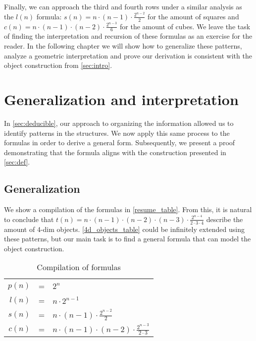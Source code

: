 \documentclass{article}
\begin{document}
	Finally, we can approach the third and fourth rows under a similar analysis as the $l(n)$ formula: $s(n) = n\cdot(n-1)\cdot\frac{2^{n-2}}{2}$ for the amount of squares and $c(n) = n\cdot(n-1)\cdot(n-2)\cdot\frac{2^{n-3}}{6}$ for the amount of cubes. We leave the task of finding the interpretation and recursion of these formulas as an exercise for the reader. In the following chapter we will show how to generalize these patterns, analyze a geometric interpretation and prove our derivation is consistent with the object construction from \autoref{sec:intro}.
	
	\section{Generalization and interpretation \label{sec:generalization}}
	
	In \autoref{sec:deducible}, our approach to organizing the information allowed us to identify patterns in the structures. We now apply this same process to the formulas in order to derive a general form. Subsequently, we present a proof demonstrating that the formula aligns with the construction presented in \autoref{sec:def}.
	
	\subsection{Generalization}
	
	We show a compilation of the formulas in \autoref{resume_table}. From this, it is natural to conclude that $t(n) = n\cdot(n-1)\cdot(n-2)\cdot(n-3)\cdot\frac{2^{n-4}}{2 \cdot 3 \cdot 4}$ describe the amount of 4-dim objects. \autoref{4d_objects_table} could be infinitely extended using these patterns, but our main task is to find a general formula that can model the object construction.
	
	
	\begin{table}[ht]
		\centering
		\begin{tabular}{r c l}
			
			$p(n)$ & = &$ 2^{n}$ \\[0.7ex]
			$l(n)$ & = &$ n \cdot 2^{n-1}$ \\[0.4ex]
			$s(n)$ & = &$ n\cdot(n-1)\cdot\frac{2^{n-2}}{2}$\\[0.4ex]
			$c(n)$ & = &$ n \cdot (n-1) \cdot (n-2) \cdot \frac{2^{n-3}}{2 \cdot 3}$%
		\end{tabular}
		\caption{Compilation of formulas}
		\label{resume_table}
	\end{table}
	
\end{document}
